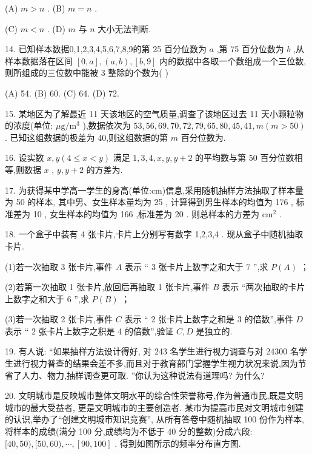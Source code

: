 (A) $m > n$ . (B) $m = n$ .

(C) $m < n$ . (D) $m$ 与 $n$ 大小无法判断.

14. 已知样本数据0,1,2,3,4,5,6,7,8,9的第 25 百分位数为 $a$ ,第 75 百分位数为 $b$ ,从样本数据落在区间 $\left\lbrack  {0,a}\right\rbrack  ,\left( {a,b}\right) ,\left\lbrack  {b,9}\right\rbrack$ 内的数据中各取一个数组成一个三位数,则所组成的三位数中能被 3 整除的个数为(   )

(A) 54. (B) 60. (C) 64. (D) 72.

15. 某地区为了解最近 11 天该地区的空气质量,调查了该地区过去 11 天小颗粒物的浓度(单位: $\mu \mathrm{g}/{\mathrm{m}}^{3}$ ),数据依次为 ${53},{56},{69},{70},{72},{79},{65},{80},{45},{41},m\left( {m > {50}}\right)$ . 已知这组数据的极差为 40,则这组数据的第 $m$ 百分位数为\blkda{}.

16. 设实数 $x,y\left( {4 \leq  x < y}\right)$ 满足 $1,3,4,x,y,y + 2$ 的平均数与第 50 百分位数相等,则数据 $x$ , $y,y + 2$ 的方差为\blkda{}.

17. 为获得某中学高一学生的身高(单位:cm)信息,采用随机抽样方法抽取了样本量为 50 的样本, 其中男、女生样本量均为 25 , 计算得到男生样本的均值为 176 , 标准差为 10 , 女生样本的均值为 166 ,标准差为 20 . 则总样本的方差为\blkda{} ${\mathrm{{cm}}}^{2}$ .

18. 一个盒子中装有 4 张卡片,卡片上分别写有数字 1,2,3,4 . 现从盒子中随机抽取卡片.

(1)若一次抽取 3 张卡片,事件 $A$ 表示 “ 3 张卡片上数字之和大于 7 ”,求 $P\left( A\right)$ ；

(2)若第一次抽取 1 张卡片,放回后再抽取 1 张卡片,事件 $B$ 表示 “两次抽取的卡片上数字之和大于 6 ”,求 $P\left( B\right)$ ；

(3)若一次抽取 2 张卡片,事件 $C$ 表示 “ 2 张卡片上数字之和是 3 的倍数”,事件 $D$ 表示 “ 2 张卡片上数字之积是 4 的倍数”,验证 $C,D$ 是独立的.

19. 有人说: “如果抽样方法设计得好, 对 243 名学生进行视力调查与对 24300 名学生进行视力普查的结果会差不多,而且对于教育部门掌握学生视力状况来说,因为节省了人力、物力,抽样调查更可取. ”你认为这种说法有道理吗? 为什么?

20. 文明城市是反映城市整体文明水平的综合性荣誉称号,作为普通市民,既是文明城市的最大受益者, 更是文明城市的主要创造者. 某市为提高市民对文明城市创建的认识,举办了“创建文明城市知识竞赛”, 从所有答卷中随机抽取 100 份作为样本, 将样本的成绩(满分 100 分,成绩均为不低于 40 分的整数)分成六段: $\lbrack {40},{50}),\lbrack {50},{60}),\cdots ,\left\lbrack  {{90},{100}}\right\rbrack$ . 得到如图所示的频率分布直方图.


